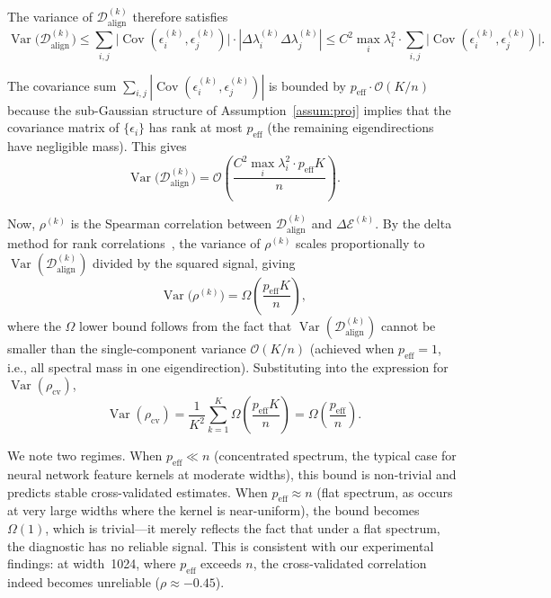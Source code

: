 \documentclass[twoside,11pt]{article}
\begin{document}
The variance of $\mathcal{D}_{\text{align}}^{(k)}$ therefore satisfies
\[
\operatorname{Var}\bigl(\mathcal{D}_{\text{align}}^{(k)}\bigr) \leq \sum_{i,j} \bigl|\operatorname{Cov}(\epsilon_i^{(k)}, \epsilon_j^{(k)})\bigr| \cdot |\Delta\lambda_i^{(k)}\Delta\lambda_j^{(k)}|
\leq C^2 \max_i \lambda_i^2 \cdot \sum_{i,j} \bigl|\operatorname{Cov}(\epsilon_i^{(k)}, \epsilon_j^{(k)})\bigr|.
\]

The covariance sum $\sum_{i,j} |\operatorname{Cov}(\epsilon_i^{(k)}, \epsilon_j^{(k)})|$ is bounded by $p_{\text{eff}} \cdot \mathcal{O}(K/n)$ because the sub-Gaussian structure of Assumption~\ref{assum:proj} implies that the covariance matrix of $\{\epsilon_i\}$ has rank at most $p_{\text{eff}}$ (the remaining eigendirections have negligible mass). This gives
\[
\operatorname{Var}\bigl(\mathcal{D}_{\text{align}}^{(k)}\bigr) = \mathcal{O}\!\left(\frac{C^2 \max_i \lambda_i^2 \cdot p_{\text{eff}} K}{n}\right).
\]

Now, $\rho^{(k)}$ is the Spearman correlation between $\mathcal{D}_{\text{align}}^{(k)}$ and $\Delta\mathcal{E}^{(k)}$. By the delta method for rank correlations~\citep{kendall1979rank}, the variance of $\rho^{(k)}$ scales proportionally to $\operatorname{Var}(\mathcal{D}_{\text{align}}^{(k)})$ divided by the squared signal, giving
\[
\operatorname{Var}\bigl(\rho^{(k)}\bigr) = \Omega\!\left(\frac{p_{\text{eff}} K}{n}\right),
\]
where the $\Omega$ lower bound follows from the fact that $\operatorname{Var}(\mathcal{D}_{\text{align}}^{(k)})$ cannot be smaller than the single-component variance $\mathcal{O}(K/n)$ (achieved when $p_{\text{eff}} = 1$, i.e., all spectral mass in one eigendirection). Substituting into the expression for $\operatorname{Var}(\rho_{\text{cv}})$,
\[
\operatorname{Var}(\rho_{\text{cv}}) = \frac{1}{K^2} \sum_{k=1}^K \Omega\!\left(\frac{p_{\text{eff}} K}{n}\right) = \Omega\!\left(\frac{p_{\text{eff}}}{n}\right).
\]

We note two regimes. When $p_{\text{eff}} \ll n$ (concentrated spectrum, the typical case for neural network feature kernels at moderate widths), this bound is non-trivial and predicts stable cross-validated estimates. When $p_{\text{eff}} \approx n$ (flat spectrum, as occurs at very large widths where the kernel is near-uniform), the bound becomes $\Omega(1)$, which is trivial---it merely reflects the fact that under a flat spectrum, the diagnostic has no reliable signal. This is consistent with our experimental findings: at width~1024, where $p_{\text{eff}}$ exceeds $n$, the cross-validated correlation indeed becomes unreliable ($\rho \approx -0.45$).
\end{document}
